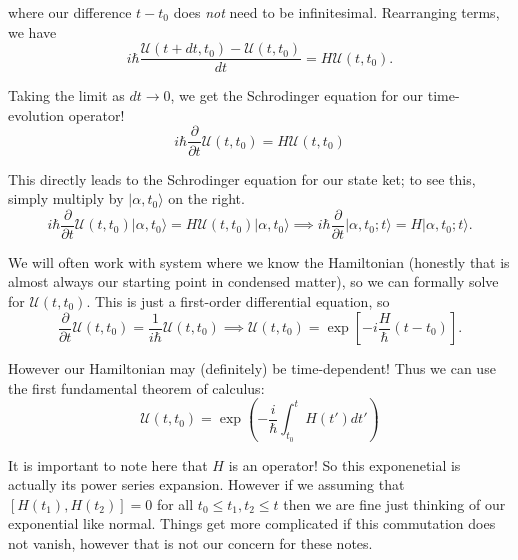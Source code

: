 \documentclass[12pt]{revtex4-2}
\begin{document}
where our difference $t-t_0$ does \emph{not} need to be infinitesimal.  Rearranging terms, we have 
\begin{equation}
    i\hbar\frac{\mathcal{U}(t+dt,t_0) - \mathcal{U}(t,t_0)}{dt} = H\mathcal{U}(t,t_0).
\end{equation}

Taking the limit as $dt \to 0$, we get the Schrodinger equation for our time-evolution operator!
\begin{equation}
    \boxed{ i\hbar\frac{\partial}{\partial t} \mathcal{U}(t,t_0) = H\mathcal{U}(t,t_0) }
\end{equation}

This directly leads to the Schrodinger equation for our state ket; to see this, simply multiply by $|\alpha,t_0\rangle$ on the right.
\begin{equation}
    i\hbar\frac{\partial}{\partial t} \mathcal{U}(t,t_0)|\alpha,t_0\rangle = H\mathcal{U}(t,t_0)|\alpha,t_0\rangle \implies i\hbar\frac{\partial}{\partial t} |\alpha,t_0;t\rangle = H |\alpha,t_0;t\rangle.
\end{equation}

We will often work with system where we know the Hamiltonian (honestly that is almost always our starting point in condensed matter), so we can formally solve for $\mathcal{U}(t,t_0)$.  This is just a first-order differential equation, so 
\begin{equation}
    \frac{\partial}{\partial t}\mathcal{U}(t,t_0) = \frac{1}{i\hbar}\mathcal{U}(t,t_0) \implies \mathcal{U}(t,t_0) = \exp\left[ -i\frac{H}{\hbar}(t-t_0) \right].
\end{equation}

However our Hamiltonian may (definitely) be time-dependent!  Thus we can use the first fundamental theorem of calculus:
\begin{equation}
    \boxed{ \mathcal{U}(t,t_0) = \exp\left(-\frac{i}{\hbar} \int_{t_0}^t H(t')dt'\right) } 
\end{equation}

It is important to note here that $H$ is an operator!  So this exponenetial is actually its power series expansion.  However if we assuming that $[H(t_1),H(t_2)]=0$ for all $t_0 \leq t_1,t_2 \leq t $ then we are fine just thinking of our exponential like normal.  Things get more complicated if this commutation does not vanish, however that is not our concern for these notes.
\end{document}
